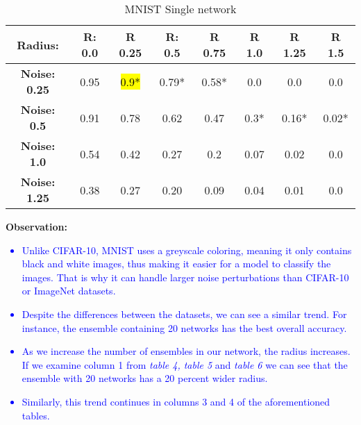 \documentclass{article}
\begin{document}
\begin{table}[htb]
    \centering
    \begin{tabular}{|c|c|c|c|c|c|c|c|} \hline 
        
        \textbf{Radius: } & \textbf{R: 0.0} & \textbf{R 0.25} & \textbf{R: 0.5} & \textbf{R 0.75} & \textbf{R 1.0} & \textbf{R 1.25} & \textbf{R 1.5}  \\ \hline 
        
        \textbf{Noise: 0.25} & 0.95 & \hl{0.9*} & 0.79* & 0.58* & 0.0 & 0.0 & 0.0 \\ \hline 
        
        \textbf{Noise: 0.5} & 0.91 & 0.78 & 0.62 & 0.47 & 0.3* & 0.16* & 0.02* \\ \hline

        \textbf{Noise: 1.0} & 0.54 & 0.42 & 0.27 & 0.2 & 0.07 & 0.02 & 0.0 \\ \hline

        \textbf{Noise: 1.25} & 0.38 & 0.27 & 0.20 & 0.09 & 0.04 & 0.01 & 0.0 \\ \hline
        
    \end{tabular}
    \caption{MNIST Single network}
    \label{tab:example}
\end{table}

\newpage
\textbf{Observation:}
\textcolor{blue}{
\begin{itemize}
    \item Unlike CIFAR-10, MNIST uses a greyscale coloring, meaning it only contains black and white images, thus making it easier for a model to classify the images. That is why it can handle larger noise perturbations than CIFAR-10 or ImageNet datasets.
    \item Despite the differences between the datasets, we can see a similar trend. For instance, the ensemble containing 20 networks has the best overall accuracy.
    \item As we increase the number of ensembles in our network, the radius increases. If we examine column 1 from \textit{table 4, table 5} and \textit{table 6} we can see that the ensemble with 20 networks has a 20 percent wider radius. 
    \item Similarly, this trend continues in columns 3 and 4 of the aforementioned tables.
\end{itemize}
}
\end{document}
